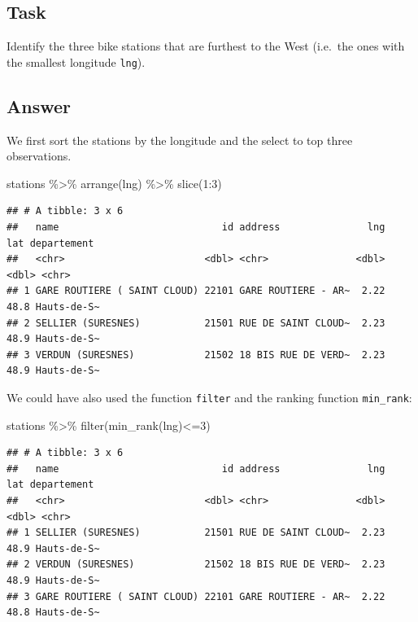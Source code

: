 \documentclass[
]{book}
\newenvironment{Shaded}{\begin{snugshade}}{\end{snugshade}}
\newcommand{\DecValTok}[1]{\textcolor[rgb]{0.00,0.00,0.81}{#1}}
\newcommand{\FunctionTok}[1]{\textcolor[rgb]{0.00,0.00,0.00}{#1}}
\newcommand{\NormalTok}[1]{#1}
\newcommand{\SpecialCharTok}[1]{\textcolor[rgb]{0.00,0.00,0.00}{#1}}
\begin{document}
\hypertarget{task-5}{%
\subsection{Task}\label{task-5}}

Identify the three bike stations that are furthest to the West (i.e.~the ones with the smallest longitude \texttt{lng}).

\hypertarget{answer-4}{%
\subsection{Answer}\label{answer-4}}

We first sort the stations by the longitude and the select to top three observations.

\begin{Shaded}
\begin{Highlighting}[]
\NormalTok{stations }\SpecialCharTok{\%\textgreater{}\%}
  \FunctionTok{arrange}\NormalTok{(lng) }\SpecialCharTok{\%\textgreater{}\%}
  \FunctionTok{slice}\NormalTok{(}\DecValTok{1}\SpecialCharTok{:}\DecValTok{3}\NormalTok{)}
\end{Highlighting}
\end{Shaded}

\begin{verbatim}
## # A tibble: 3 x 6
##   name                            id address               lng   lat departement
##   <chr>                        <dbl> <chr>               <dbl> <dbl> <chr>      
## 1 GARE ROUTIERE ( SAINT CLOUD) 22101 GARE ROUTIERE - AR~  2.22  48.8 Hauts-de-S~
## 2 SELLIER (SURESNES)           21501 RUE DE SAINT CLOUD~  2.23  48.9 Hauts-de-S~
## 3 VERDUN (SURESNES)            21502 18 BIS RUE DE VERD~  2.23  48.9 Hauts-de-S~
\end{verbatim}

We could have also used the function \texttt{filter} and the ranking function \texttt{min\_rank}:

\begin{Shaded}
\begin{Highlighting}[]
\NormalTok{stations }\SpecialCharTok{\%\textgreater{}\%}
  \FunctionTok{filter}\NormalTok{(}\FunctionTok{min\_rank}\NormalTok{(lng)}\SpecialCharTok{\textless{}=}\DecValTok{3}\NormalTok{)}
\end{Highlighting}
\end{Shaded}

\begin{verbatim}
## # A tibble: 3 x 6
##   name                            id address               lng   lat departement
##   <chr>                        <dbl> <chr>               <dbl> <dbl> <chr>      
## 1 SELLIER (SURESNES)           21501 RUE DE SAINT CLOUD~  2.23  48.9 Hauts-de-S~
## 2 VERDUN (SURESNES)            21502 18 BIS RUE DE VERD~  2.23  48.9 Hauts-de-S~
## 3 GARE ROUTIERE ( SAINT CLOUD) 22101 GARE ROUTIERE - AR~  2.22  48.8 Hauts-de-S~
\end{verbatim}
\end{document}
